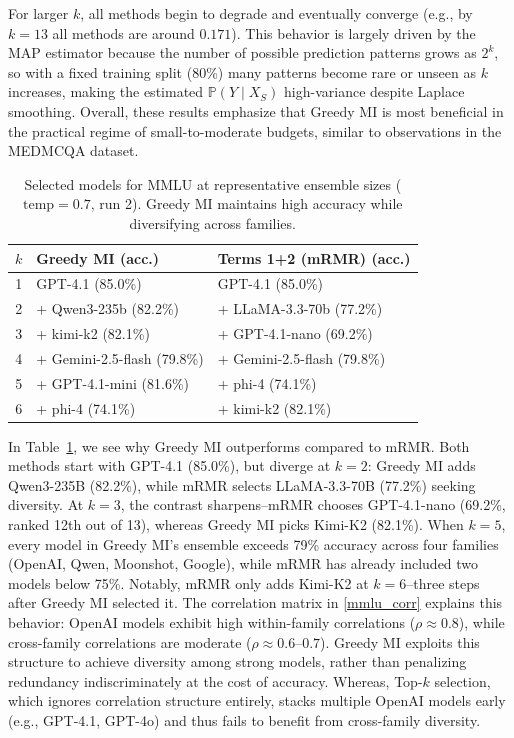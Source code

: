 \documentclass{article}
\theoremstyle{plain}
\theoremstyle{definition}
\theoremstyle{remark}
\begin{document}
For larger $k$, all methods begin to degrade and eventually converge (e.g., by $k=13$ all methods are around $0.171$). This behavior is largely driven by the MAP estimator because the number of possible prediction patterns grows as $2^k$, so with a fixed training split (80\%) many patterns become rare or unseen as $k$ increases, making the estimated $\mathbb{P}(Y\mid X_S)$ high-variance despite Laplace smoothing. Overall, these results emphasize that Greedy MI is most beneficial in the practical regime of small-to-moderate budgets, similar to observations in the MEDMCQA dataset.
\begin{table}[t]
\centering
\caption{Selected models for MMLU at representative ensemble sizes (\(\text{temp}=0.7\), run 2). Greedy MI maintains high accuracy while diversifying across families.}
\label{tab:mmlu_selections}%
\small
\setlength{\tabcolsep}{4pt}
\begin{tabularx}{\columnwidth}{cXX}
\toprule
$k$ & \textbf{Greedy MI (acc.)} & \textbf{Terms 1+2 (mRMR) (acc.)} \\
\midrule
1 & GPT-4.1 (85.0\%) & GPT-4.1 (85.0\%) \\
2 & + Qwen3-235b (82.2\%) & + LLaMA-3.3-70b (77.2\%) \\
3 & + kimi-k2 (82.1\%) & + GPT-4.1-nano (69.2\%) \\
4 & + Gemini-2.5-flash (79.8\%) & + Gemini-2.5-flash (79.8\%) \\
5 & + GPT-4.1-mini (81.6\%) & + phi-4 (74.1\%) \\
6 & + phi-4 (74.1\%)  & + kimi-k2 (82.1\%) \\
\bottomrule
\end{tabularx}
\end{table}

In Table~\ref{tab:mmlu_selections}, we see why Greedy MI outperforms compared to mRMR. Both methods start with GPT-4.1 (85.0\%), but diverge at $k=2$: Greedy MI adds Qwen3-235B (82.2\%), while mRMR selects LLaMA-3.3-70B (77.2\%) seeking diversity. At $k=3$, the contrast sharpens--mRMR chooses GPT-4.1-nano (69.2\%, ranked 12th out of 13), whereas Greedy MI picks Kimi-K2 (82.1\%). When $k=5$, every model in Greedy MI's ensemble exceeds 79\% accuracy across four families (OpenAI, Qwen, Moonshot, Google), while mRMR has already included two models below 75\%. Notably, mRMR only adds Kimi-K2 at $k=6$--three steps after Greedy MI selected it. The correlation matrix in \cref{mmlu_corr} explains this behavior: OpenAI models exhibit high within-family correlations ($\rho \approx 0.8$), while cross-family correlations are moderate ($\rho \approx 0.6$--$0.7$). Greedy MI exploits this structure to achieve diversity among strong models, rather than penalizing redundancy indiscriminately at the cost of accuracy. Whereas, Top-$k$ selection, which ignores correlation structure entirely, stacks multiple OpenAI models early (e.g., GPT-4.1, GPT-4o) and thus fails to benefit from cross-family diversity.
\end{document}
